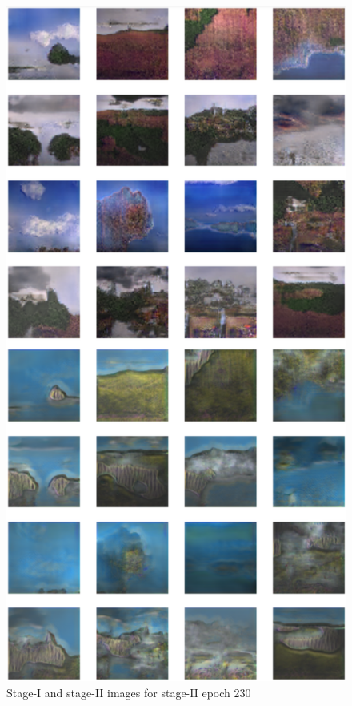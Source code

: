 \documentclass{article}
\begin{document}
	\begin{figure}[h]
	\centering
	\includegraphics[scale=0.6]{images/epoch230_FID430.png}
	\caption{Stage-I and stage-II images for stage-II epoch 230}
	\end{figure}
\end{document}
